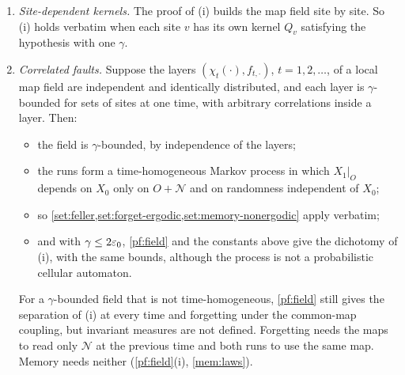 \begin{remark}
\begin{enumerate}[label=\textup{(\alph*)}]
reset, so this process forgets and is ergodic for every $M$. When $M$ does not halt,
it has no $\gamma'$-bounded common-map representation for any $\gamma'<1$: from a
cloned tiling configuration $\xi$, a reset makes every site of any finite set wrong
at once, with probability $\gamma$.
\item \emph{Site-dependent kernels.} The proof of (i) builds the map field site by
site. So (i) holds verbatim when each site $v$ has its own kernel $Q_v$ satisfying
the hypothesis with one $\gamma$.
\item \emph{Correlated faults.} Suppose the layers
$(\chi_t(\cdot),f_{t,\cdot})$, $t=1,2,\dots$, of a local map field are independent
and identically distributed, and each layer is $\gamma$-bounded for sets of sites at
one time, with arbitrary correlations inside a layer. Then:
\begin{itemize}
\item the field is $\gamma$-bounded, by independence of the layers;
\item the runs form a time-homogeneous Markov process in which $X_1|_O$ depends on
$X_0$ only on $O+\mathcal N$ and on randomness independent of $X_0$;
\item so \cref{set:feller,set:forget-ergodic,set:memory-nonergodic} apply verbatim;
\item and with $\gamma\le2\varepsilon_0$, \cref{pf:field} and the constants above give the
dichotomy of (i), with the same bounds, although the process is not a probabilistic
cellular automaton.
\end{itemize}
For a $\gamma$-bounded field that is not time-homogeneous, \cref{pf:field} still
gives the separation of (i) at every time and forgetting under the common-map
coupling, but invariant measures are not defined. Forgetting needs the maps to read
only $\mathcal N$ at the previous time and both runs to use the same map. Memory
needs neither (\cref{pf:field}(i), \cref{mem:laws}).
\end{enumerate}
\end{remark}

